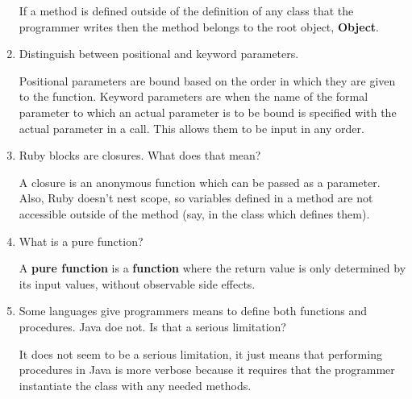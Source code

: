 \begin{enumerate}
  \begin{answer}

    If a method is defined outside of the definition of any
    class that the programmer writes then the method belongs
    to the root object, \textbf{Object}.

  \end{answer}

  \item Distinguish between positional and keyword parameters.

  \begin{answer}

    Positional parameters are bound based on the order in which
    they are given to the function. Keyword parameters are when
    the name of the formal parameter to which an actual
    parameter is to be bound is specified with the actual
    parameter in a call. This allows them to be input in any
    order.

  \end{answer}

  \item Ruby blocks are closures. What does that mean?

  \begin{answer}

    A closure is an anonymous function which can be passed as
    a parameter. Also, Ruby doesn't nest scope, so variables
    defined in a method are not accessible outside of the
    method (say, in the class which defines them).

  \end{answer}

  \item What is a pure function?

  \begin{answer}

    A \textbf{pure function} is a \textbf{function} where the return value
    is only determined by its input values, without
    observable side effects.

  \end{answer}

  \item Some languages give programmers means to define
    both functions and procedures. Java doe not. Is that
    a serious limitation?

  \begin{answer}

    It does not seem to be a serious limitation, it just means
    that performing procedures in Java is more verbose because
    it requires that the programmer instantiate the class with
    any needed methods.


\end{answer}
\end{enumerate}
